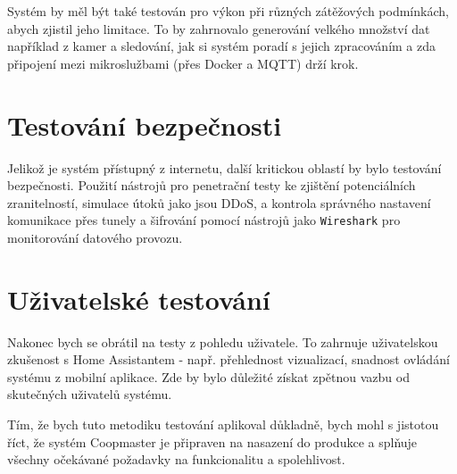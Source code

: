 Systém by měl být také testován pro výkon při různých zátěžových podmínkách, abych zjistil jeho limitace.
To by zahrnovalo generování velkého množství dat například z kamer a sledování, jak si systém poradí s jejich zpracováním a zda připojení mezi mikroslužbami (přes Docker a MQTT) drží krok.

\section{Testování bezpečnosti}\label{sec:testovani-bezpecnosti}

Jelikož je systém přístupný z internetu, další kritickou oblastí by bylo testování bezpečnosti.
Použití nástrojů pro penetrační testy ke zjištění potenciálních zranitelností, simulace útoků jako jsou DDoS, a kontrola správného nastavení komunikace přes tunely a šifrování pomocí nástrojů jako \texttt{Wireshark} pro monitorování datového provozu.

\section{Uživatelské testování}\label{sec:uzivatelske-testovani}

Nakonec bych se obrátil na testy z pohledu uživatele.
To zahrnuje uživatelskou zkušenost s Home Assistantem - např. přehlednost vizualizací, snadnost ovládání systému z mobilní aplikace.
Zde by bylo důležité získat zpětnou vazbu od skutečných uživatelů systému.

Tím, že bych tuto metodiku testování aplikoval důkladně, bych mohl s jistotou říct, že systém Coopmaster je připraven na nasazení do produkce a splňuje všechny očekávané požadavky na funkcionalitu a spolehlivost.